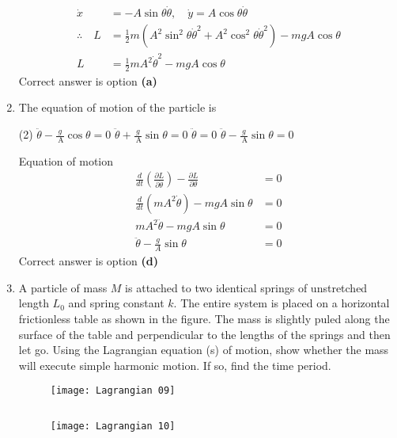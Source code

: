 \begin{enumerate}
\begin{answer}
\begin{align*}
	\dot{x}&=-A \sin \theta \dot{\theta}, \quad \dot{y}=A \cos \theta \dot{\theta}\\
	 \therefore \quad L &=\frac{1}{2} m\left(A^{2} \sin ^{2} \theta \dot{\theta}^{2}+A^{2} \cos ^{2} \theta \dot{\theta}^{2}\right)-m g A \cos \theta \\ L &=\frac{1}{2} m A^{2} \dot{\theta}^{2}-m g A \cos \theta 
	\end{align*}
	 Correct answer is option \textbf{(a)}
\end{answer}
\item The equation of motion of the particle is
 \begin{tasks}(2)
	\task[\textbf{a.}]$\ddot{\theta}-\frac{g}{\mathrm{~A}} \cos \theta=0$
	\task[\textbf{b.}]$\ddot{\theta}+\frac{g}{\mathrm{~A}} \sin \theta=0$
	\task[\textbf{c.}] $\ddot{\theta}=0$
	\task[\textbf{d.}]  $\ddot{\theta}-\frac{g}{\mathrm{~A}} \sin \theta=0$
\end{tasks}
\begin{answer}
	Equation of motion
	\begin{align*}
	\frac{d}{d t}\left(\frac{\partial L}{\partial \dot{\theta}}\right)-\frac{\partial L}{\partial \theta}&=0\\
	\frac{d}{d t}\left(m A^{2} \dot{\theta}\right)-m g A \sin \theta&=0\\
	m A^{2} \ddot{\theta}-m g A \sin \theta&=0\\
	\ddot{\theta}-\frac{g}{A} \sin \theta&=0
	\end{align*}
	Correct answer is option \textbf{(d)}
\end{answer}
\item A particle of mass $M$ is attached to two identical springs of unstretched length $L_{0}$ and spring constant $k$. The entire system is placed on a horizontal frictionless table as shown in the figure. The mass is slightly puled along the surface of the table and perpendicular to the lengths of the springs and then let go. Using the Lagrangian equation (s) of motion, show whether the mass will execute simple harmonic motion. If so, find the time period.
\begin{figure}[H]
	\centering
	\texttt{[image: Lagrangian 09]}
\end{figure}
\begin{answer}$\left. \right. $
	\begin{figure}[H]
		\centering
		\texttt{[image: Lagrangian 10]}
	\end{figure}
	\begin{align*}

\end{align*}
\end{answer}
\end{enumerate}
